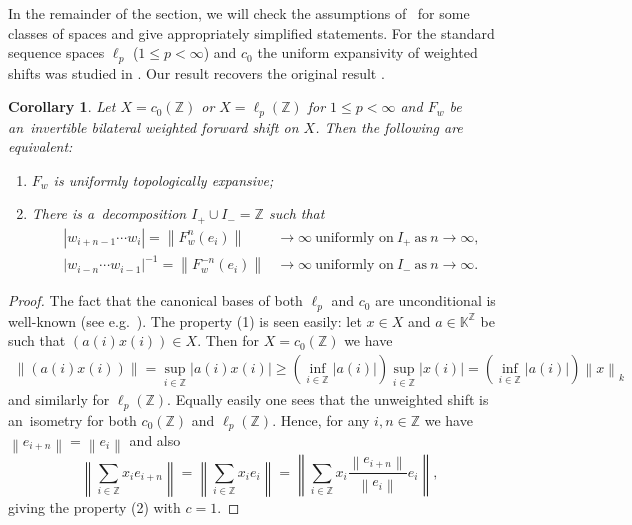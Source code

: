 \documentclass[11pt,a4paper]{amsart}
\newtheorem{corollary}[theorem]{Corollary}
\theoremstyle{definition}
\newcommand{\Z}{\mathbb{Z}}
\newcommand{\K}{\mathbb{K}}
\newcommand{\abs}[1]{\left| #1 \right|}
\newcommand{\norm}[1]{\left\| #1 \right\|}
\begin{document}
	In the remainder of the section, we will check the assumptions of~ for some classes of spaces and give appropriately simplified statements. For the standard sequence spaces \(\ell_p\) (\(1 \leq p < \infty\)) and \(c_0\) the uniform expansivity of weighted shifts was studied in \cite{Expansivity_and_shadowing}. Our result recovers the original result \cite[Theorem E]{Expansivity_and_shadowing}.
	
	\begin{corollary}
		\label{cor:UTEforEllpAndc0}
		Let $X = c_0(\Z)$ or $X = \ell_p(\Z)$ for $1 \leq p < \infty$ and $F_w$ be an~invertible bilateral weighted forward shift on $X$. Then the following are equivalent:
		\begin{enumerate}
			\item \(F_w\) is uniformly topologically expansive;
			\item There is a~decomposition \(I_{+} \cup I_{-} =\Z\) such that
			\begin{align*}
				\abs{w_{i+n-1} \cdots w_{i}} = \norm{F_w^n(e_i)} &\to \infty \ \text{uniformly on} \ I_+ \ \text{as} \ n \to \infty, \\
				\abs{w_{i-n} \cdots w_{i-1}}^{-1} = \norm{F_w^{-n}(e_i)} &\to \infty \ \text{uniformly on} \ I_- \ \text{as} \ n \to \infty.
			\end{align*}
		\end{enumerate}
	\end{corollary}
	\begin{proof}
		The fact that the canonical bases of both $\ell_p$ and $c_0$ are unconditional is well-known (see e.g.~\cite{BanachSpaceTheory}). The property (1) is seen easily: let $x \in X$ and $a \in \K^\Z$ be such that $(a(i)x(i)) \in X$. Then for $X = c_0(\Z)$ we have
		\begin{align*}
			\norm{(a(i)x(i))}
			= \sup_{i \in \Z} \abs{a(i)x(i)}
			\geq \left(\inf_{i \in \Z} |a(i)|\right) \sup_{i \in \Z} \abs{x(i)}
			= \left(\inf_{i \in \Z} |a(i)|\right) \norm{x}_k
		\end{align*}
		and similarly for $\ell_p(\Z)$.	Equally easily one sees that the unweighted shift is an~isometry for both $c_0(\Z)$ and $\ell_p(\Z)$. Hence, for any $i, n \in \Z$ we have $\norm{e_{i+n}} = \norm{e_i}$ and also
		\begin{equation*}
			\norm{\sum_{i\in\Z}x_i e_{i+n}}
			= \norm{\sum_{i\in\Z} x_i e_i}
			= \norm{\sum_{i\in\Z} x_i \frac{\norm{e_{i+n}}}{\norm{e_i}} e_i},
		\end{equation*}
		giving the property (2) with $c = 1$.
	\end{proof}
	
\end{document}
